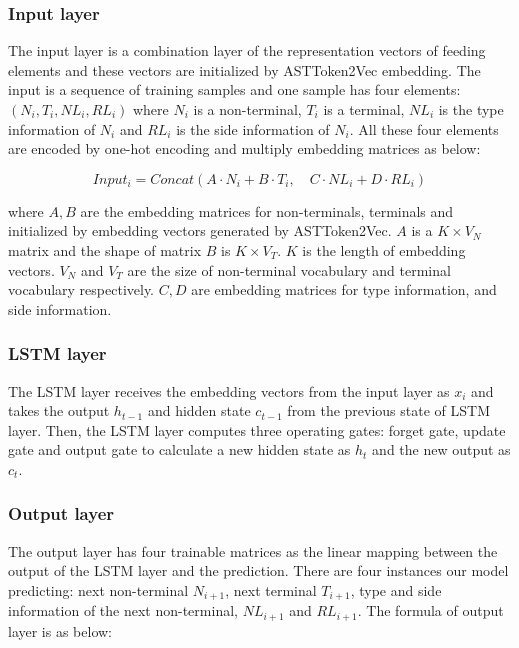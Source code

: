 \documentclass[T, E]{compsoft}
\begin{document}
\subsubsection{Input layer}
The input layer is a combination layer of the representation vectors of feeding elements and these vectors are initialized by ASTToken2Vec embedding.
The input is a sequence of training samples and one sample has four elements: $(N_{i}, T_{i}, NL_{i}, RL_{i})$ where $N_{i}$ is a non-terminal, $T_{i}$ is a terminal, $NL_{i}$ is the type information of $N_{i}$ and $RL_{i}$ is the side information of $N_{i}$. All these four elements are encoded by one-hot encoding and multiply embedding matrices as below:

\begin{equation}
Input_{i} = Concat(A\cdot N_{i} + B\cdot T_{i}, \quad C\cdot NL_{i} + D\cdot RL_{i})\label{equ:input}
\end{equation}

where $A, B$ are the embedding matrices for non-terminals, terminals and initialized by embedding vectors generated by ASTToken2Vec. $A$ is a $K \times V_{N} $ matrix and the shape of matrix $B$ is $K \times V_{T}$. $K$ is the length of embedding vectors. 
$V_{N}$ and $V_{T}$ are the size of non-terminal vocabulary and terminal vocabulary respectively. 
$C, D$ are embedding matrices for type information, and side information.


\subsubsection{LSTM layer}
The LSTM layer receives the embedding vectors from the input layer as $x_{i}$ and takes the output $h_{t-1}$ and hidden state $c_{t-1}$ from the previous state of LSTM layer. 
Then, the LSTM layer computes three operating gates: forget gate, update gate and output gate to calculate a new hidden state as $h_{t}$ and the new output as $c_{t}$.



\subsubsection{Output layer}
The output layer has four trainable matrices as the linear mapping between the output of the LSTM layer and the prediction. 
There are four instances our model predicting: 
next non-terminal $N_{i+1}$, next terminal $T_{i+1}$, type and side information of the next non-terminal, $NL_{i+1}$ and $RL_{i+1}$. 
The formula of output layer is as below:
\end{document}
